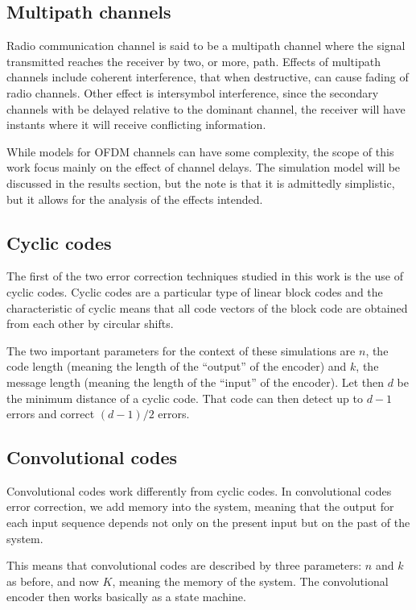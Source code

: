 \subsection{Multipath channels}

Radio communication channel is said to be a multipath channel where the signal
transmitted reaches the receiver by two, or more, path. Effects of multipath
channels include coherent interference, that when destructive, can cause fading of
radio channels. Other effect is intersymbol interference, since the secondary
channels with be delayed relative to the dominant channel, the receiver will have
instants where it will receive conflicting information.

While models for OFDM channels can have some complexity, the scope of this work
focus mainly on the effect of channel delays. The simulation model will be
discussed in the results section, but the note is that it is admittedly
simplistic, but it allows for the analysis of the effects intended.

\subsection{Cyclic codes}

The first of the two error correction techniques studied in this work is the use
of cyclic codes. Cyclic codes are a particular type of linear block codes and the
characteristic of cyclic means that all code vectors of the block code are
obtained from each other by circular shifts.

The two important parameters for the context of these simulations are \(n\), the
code length (meaning the length of the ``output'' of the encoder) and \(k\), the
message length (meaning the length of the ``input'' of the encoder). Let then
\(d\) be the minimum distance of a cyclic code. That code can then detect up to
\(d-1\) errors and correct \((d-1)/2\) errors.

\subsection{Convolutional codes}

Convolutional codes work differently from cyclic codes. In convolutional codes
error correction, we add memory into the system, meaning that the output for each
input sequence depends not only on the present input but on the past of the
system.

This means that convolutional codes are described by three parameters: \(n\) and
\(k\) as before, and now \(K\), meaning the memory of the system. The
convolutional encoder then works basically as a state machine.


